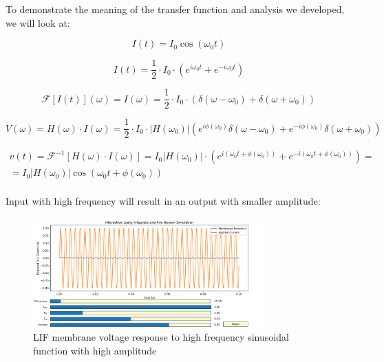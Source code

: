 To demonstrate the meaning of the transfer function and analysis we developed, we will look at:

\begin{equation}
    I(t) = I_0 \cos(\omega_0 t)
\end{equation}

\begin{equation}
    I(t) = \frac{1}{2} \cdot I_0 \cdot \left(e^{i\omega_0 t} + e^{-i\omega_0 t}\right)
\end{equation}

\begin{equation}
    \mathcal{F}[I(t)](\omega) = I(\omega) = \frac{1}{2} \cdot I_0 \cdot \left(\delta(\omega - \omega_0) + \delta(\omega + \omega_0)\right)
\end{equation}

\begin{equation}
    V(\omega) = H(\omega) \cdot I(\omega) = \frac{1}{2}  \cdot I_0 \cdot |H(\omega_0)| \left(e^{i\phi(\omega_0)} \delta(\omega - \omega_0) + e^{-i\phi(\omega_0)} \delta(\omega + \omega_0)\right)
\end{equation}

\begin{equation}
\begin{aligned}
    v(t) = \mathcal{F}^{-1}[H(\omega) \cdot I(\omega)] = I_0 |H(\omega_0)| \cdot \left(e^{i(\omega_0 t + \phi(\omega_0))} + e^{-i(\omega_0 t + \phi(\omega_0))}\right) = \\ = I_0 |H(\omega_0)| \cos(\omega_0 t + \phi(\omega_0))
\end{aligned}
\end{equation} \\

Input with high frequency will result in an output with smaller amplitude:

\begin{figure}[H]
    \centering
    \includegraphics[width=0.8\textwidth]{scientific-background/computational-models/LIF/graphs/LIF-high-freq-sin-response.png}
    \caption{LIF membrane voltage response to high frequency sinusoidal function with high amplitude}
    \label{fig:LIF-high-freq-sin}
\end{figure}

